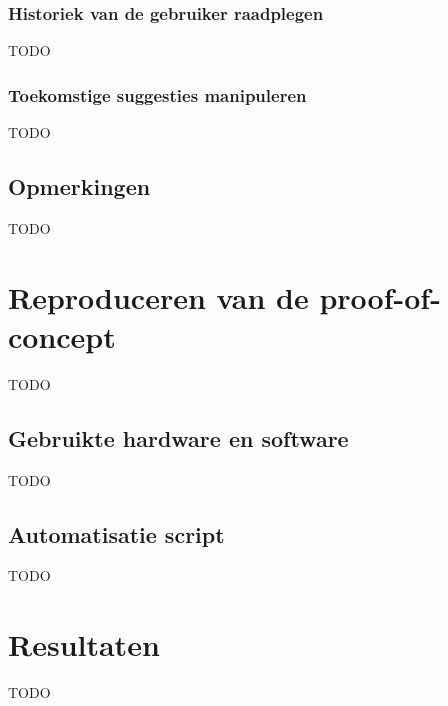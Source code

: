 \subsubsection{Historiek van de gebruiker raadplegen}
TODO %

\subsubsection{Toekomstige suggesties manipuleren}
TODO %

\subsection{Opmerkingen}
\label{subsec:opmerkingen}
TODO %

\section{Reproduceren van de proof-of-concept}
\label{sec:reproduceren-van-de-proof-of-concept}
TODO %

\subsection{Gebruikte hardware en software}
\label{subsec:gebruikte-hardware-en-software}
TODO %

\subsection{Automatisatie script}
\label{subsec:automatisatie-script}
TODO %

\section{Resultaten}
\label{sec:resultaten}
TODO %